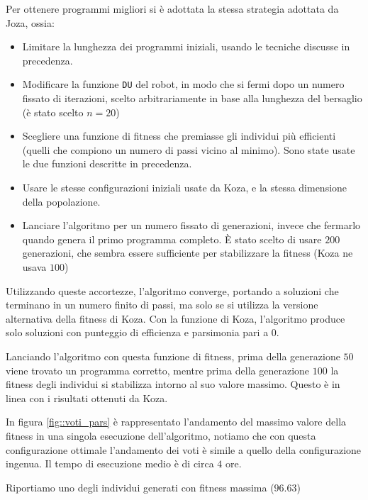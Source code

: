 \documentclass[paper=a4, fontsize=11pt]{scrartcl}
\numberwithin{equation}{section}		%
\numberwithin{figure}{section}			%
\numberwithin{table}{section}				%
\begin{document}
Per ottenere programmi migliori si è adottata la stessa strategia adottata da Joza, ossia:

\begin{itemize}
\item Limitare la lunghezza dei programmi iniziali, usando le tecniche discusse in precedenza.
\item Modificare la funzione \texttt{DU} del robot, in modo che si fermi dopo un numero fissato di iterazioni, scelto arbitrariamente in base alla lunghezza del bersaglio (è stato scelto $n=20$)
\item Scegliere una funzione di fitness che premiasse gli individui più efficienti (quelli che compiono un numero di passi vicino al minimo). Sono state usate le due funzioni descritte in precedenza.
\item Usare le stesse configurazioni iniziali usate da Koza, e la stessa dimensione della popolazione.
\item Lanciare l'algoritmo per un numero fissato di generazioni, invece che fermarlo quando genera il primo programma completo. È stato scelto di usare $200$ generazioni, che sembra essere sufficiente per stabilizzare la fitness (Koza ne usava $100$)
\end{itemize}

Utilizzando queste accortezze, l'algoritmo converge, portando a soluzioni che terminano in un numero finito di passi, ma solo se si utilizza la versione alternativa della fitness di Koza. Con la funzione di Koza, l'algoritmo produce solo soluzioni con punteggio di efficienza e parsimonia pari a $0$. 

Lanciando l'algoritmo con questa funzione di fitness, prima della generazione $50$ viene trovato un programma corretto, mentre prima della generazione $100$ la fitness degli individui si stabilizza intorno al suo valore massimo. Questo è in linea con i risultati ottenuti da Koza.

In figura \ref{fig::voti_pars} è rappresentato l'andamento del massimo valore della fitness in una singola esecuzione dell'algoritmo, notiamo che con questa configurazione ottimale l'andamento dei voti è simile a quello della configurazione ingenua. Il tempo di esecuzione medio è di circa $4$ ore.

Riportiamo uno degli individui generati con fitness massima ($96.63$)
\end{document}
